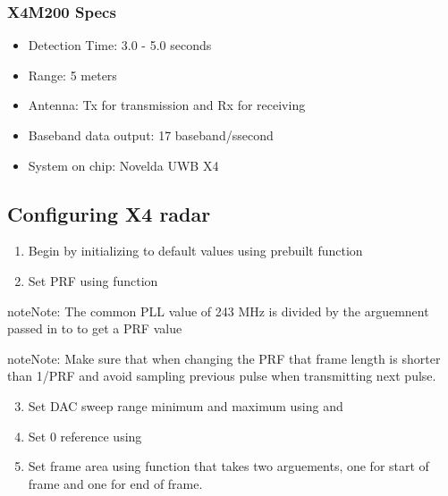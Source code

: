 \documentclass[letterpaper,10pt,english]{sphinxmanual}
\begin{document}
\subsubsection{X4M200 Specs}
\label{\detokenize{radar information:x4m200-specs}}\begin{itemize}
\item {} 
Detection Time: 3.0  - 5.0 seconds

\item {} 
Range: 5 meters

\item {} 
Antenna: Tx for transmission and Rx for receiving

\item {} 
Baseband data output: 17 baseband/ssecond

\item {} 
System on chip: Novelda UWB X4

\end{itemize}


\subsection{Configuring X4 radar}
\label{\detokenize{radar information:configuring-x4-radar}}\begin{enumerate}
\item {} 
Begin by initializing to default values using prebuilt function 

\item {} 
Set PRF using function 

\end{enumerate}

\begin{sphinxadmonition}{note}{Note:}
The common PLL value of 243 MHz is divided by the arguemnent passed in to  to get a PRF value
\end{sphinxadmonition}

\begin{sphinxadmonition}{note}{Note:}
Make sure that when changing the PRF that frame length is shorter than 1/PRF and avoid sampling previous pulse when transmitting next pulse.
\end{sphinxadmonition}
\begin{enumerate}
\setcounter{enumi}{2}
\item {} 
Set DAC sweep range minimum and maximum using  and 

\item {} 
Set 0 reference using 

\item {} 
Set frame area using function  that takes two arguements, one for start of frame and one for end of frame.

\end{enumerate}
\end{document}
